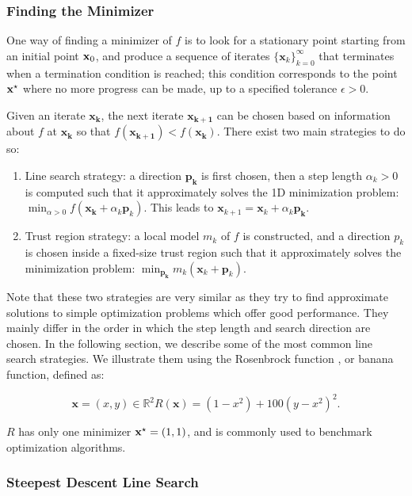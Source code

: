 \subsubsection{Finding the Minimizer}

One way of finding a minimizer of $f$ is to look for a stationary
point starting from an initial point $\mathbf{x}_0$, and produce a
sequence of iterates $\{\mathbf{x}_k\}_{k=0}^{\infty}$ that terminates
when a termination condition is reached; this condition corresponds to
the point $\mathbf{x}^{\star}$ where no more progress can be made, up to a
specified tolerance $\epsilon > 0$.

Given an iterate $\mathbf{x_k}$, the next iterate $\mathbf{x_{k+1}}$
can be chosen based on information about $f$ at $\mathbf{x_k}$ so that
$f(\mathbf{x_{k+1}})<f(\mathbf{x_k})$. There exist two main strategies
to do so:

\begin{enumerate}
\item Line search strategy: a direction $\mathbf{p_k}$ is first
  chosen, then a step length $\alpha_k > 0$ is computed such that it
  approximately solves the 1D minimization problem: $\min_{\alpha>0}
  f(\mathbf{x_k}+\alpha_k\mathbf{p}_k)$. This leads to
  $\mathbf{x}_{k+1}=\mathbf{x}_k+\alpha_k\mathbf{p_k}.$
\item Trust region strategy: a local model $m_k$ of $f$ is
  constructed, and a direction $p_k$ is chosen inside a fixed-size
  trust region such that it approximately solves the minimization
  problem: $\min_{\mathbf{p_k}} m_k(\mathbf{x}_k+\mathbf{p}_k)$.
\end{enumerate}

Note that these two strategies are very similar as they try to find
approximate solutions to simple optimization problems which offer good
performance. They mainly differ in the order in which the step length
and search direction are chosen. In the following section, we describe
some of the most common line search strategies. We illustrate them
using the Rosenbrock function \cite{rosenbrock1960automatic}, or banana
function, defined as:

\begin{equation}
\mathbf{x} = (x,y) \in \mathbb R^2 R(\mathbf{x}) =
(1-x^2)+100(y-x^2)^2.
\end{equation}

$R$ has only one minimizer $\mathbf{x}^{\star} = (1,1)$, and is commonly used
to benchmark optimization algorithms.

\subsubsection{Steepest Descent Line Search}

